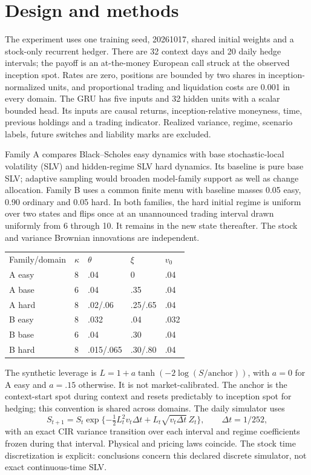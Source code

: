 \section*{Design and methods}
The experiment uses one training seed, 20261017, shared initial weights and a stock-only recurrent hedger. There are 32 context days and 20 daily hedge intervals; the payoff is an at-the-money European call struck at the observed inception spot. Rates are zero, positions are bounded by two shares in inception-normalized units, and proportional trading and liquidation costs are 0.001 in every domain. The GRU has five inputs and 32 hidden units with a scalar bounded head. Its inputs are causal returns, inception-relative moneyness, time, previous holdings and a trading indicator. Realized variance, regime, scenario labels, future switches and liability marks are excluded.

Family A compares Black--Scholes easy dynamics with base stochastic-local volatility (SLV) and hidden-regime SLV hard dynamics. Its baseline is pure base SLV; adaptive sampling would broaden model-family support as well as change allocation. Family B uses a common finite menu with baseline masses 0.05 easy, 0.90 ordinary and 0.05 hard. In both families, the hard initial regime is uniform over two states and flips once at an unannounced trading interval drawn uniformly from 6 through 10. It remains in the new state thereafter. The stock and variance Brownian innovations are independent.

\begin{center}
\begin{tabular}{lllll}
Family/domain & $\kappa$ & $\theta$ & $\xi$ & $v_0$ \\
A easy & 8 & .04 & 0 & .04 \\
A base & 6 & .04 & .35 & .04 \\
A hard & 8 & .02/.06 & .25/.65 & .04 \\
B easy & 8 & .032 & .04 & .032 \\
B base & 6 & .04 & .30 & .04 \\
B hard & 8 & .015/.065 & .30/.80 & .04
\end{tabular}
\end{center}

The synthetic leverage is $L=1+a\tanh(-2\log(S/\mathrm{anchor}))$, with $a=0$ for A easy and $a=.15$ otherwise. It is not market-calibrated. The anchor is the context-start spot during context and resets predictably to inception spot for hedging; this convention is shared across domains. The daily simulator uses
\[
S_{t+1}=S_t\exp\{-\tfrac12L_t^2v_t\Delta t+L_t\sqrt{v_t\Delta t}\,Z_t\},\qquad\Delta t=1/252,
\]
with an exact CIR variance transition over each interval and regime coefficients frozen during that interval. Physical and pricing laws coincide. The stock time discretization is explicit: conclusions concern this declared discrete simulator, not exact continuous-time SLV.


